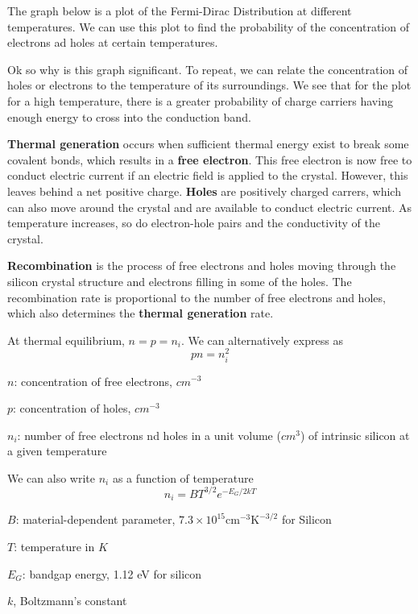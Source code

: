 The graph below is a plot of the Fermi-Dirac Distribution at different temperatures. We can use this plot to find the probability of the concentration of electrons ad holes at certain temperatures.



Ok so why is this graph significant. To repeat, we can relate the concentration of holes or electrons to the temperature of its surroundings. We see that for the plot for a high temperature, there is a greater probability of charge carriers having enough energy to cross into the conduction band.

\textbf{Thermal generation} occurs when sufficient thermal energy exist to break some covalent bonds, which results in a \textbf{free electron}. This free electron is now free to conduct electric current if an electric field is applied to the crystal. However, this leaves behind a net positive charge. \textbf{Holes} are positively charged carrers, which can also move around the crystal and are available to conduct electric current. As temperature increases, so do electron-hole pairs and the conductivity of the crystal. 

\textbf{Recombination} is the process of free electrons and  holes moving through the silicon crystal structure and electrons filling in some of the holes. The recombination rate is proportional to the number of free electrons and holes, which also determines the \textbf{thermal generation} rate.

At thermal equilibrium, $n = p = n_i$. We can alternatively express as
\[pn = n_i^2\]
\begin{gline}
    \item $n$: concentration of free electrons, $cm^{-3}$
    \item $p$: concentration of holes, $cm^{-3}$
    \item $n_i$: number of free electrons nd holes in a unit volume ($cm^3$) of intrinsic silicon at a given temperature
\end{gline}

We can also write $n_i$ as a function of temperature
\[n_i = BT^{3/2} e^{-E_G / 2kT}\]
\begin{gline}
    \item $B$: material-dependent parameter, $7.3 \times 10^{15} \text{cm}^{-3} \text{K}^{-3/2}$ for Silicon
    \item $T$: temperature in $K$
    \item $E_G$: bandgap energy, 1.12 eV for silicon
    \item $k$, Boltzmann's constant
\end{gline}


